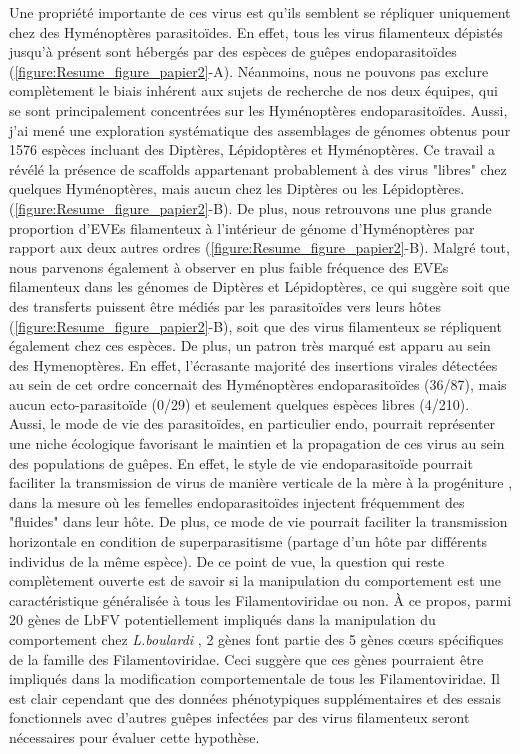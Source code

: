 Une propriété importante de ces virus est qu'ils semblent se répliquer uniquement chez des Hyménoptères parasitoïdes. En effet, tous les virus filamenteux dépistés jusqu'à présent sont hébergés par des espèces de guêpes endoparasitoïdes (\figurename{\ref{figure:Resume_figure_papier2}}-A). Néanmoins, nous ne pouvons pas exclure complètement le biais inhérent aux sujets de recherche de nos deux équipes, qui se sont principalement concentrées sur les Hyménoptères endoparasitoïdes. Aussi, j'ai mené une exploration systématique des assemblages de génomes obtenus pour 1576 espèces incluant des Diptères, Lépidoptères et Hyménoptères. Ce travail a révélé la présence de scaffolds appartenant probablement à des virus "libres" chez quelques Hyménoptères, mais aucun chez les Diptères ou les Lépidoptères. (\figurename{\ref{figure:Resume_figure_papier2}}-B). De plus, nous retrouvons une plus grande proportion d'EVEs filamenteux à l'intérieur de génome d'Hyménoptères par rapport aux deux autres ordres (\figurename{\ref{figure:Resume_figure_papier2}}-B). Malgré tout, nous parvenons également à observer en plus faible fréquence des EVEs filamenteux dans les génomes de  Diptères et Lépidoptères, ce qui suggère soit que des transferts puissent être médiés par les parasitoïdes vers leurs hôtes (\figurename{\ref{figure:Resume_figure_papier2}}-B), soit que des virus filamenteux se répliquent également chez ces espèces. De plus, un patron très marqué est apparu au sein des Hymenoptères. En effet, l'écrasante majorité des insertions virales détectées au sein de cet ordre concernait des Hyménoptères endoparasitoïdes (36/87), mais aucun ecto-parasitoïde (0/29) et seulement quelques espèces libres (4/210).\\

Aussi, le mode de vie des parasitoïdes, en particulier endo, pourrait représenter une niche écologique favorisant le maintien et la propagation de ces virus au sein des populations de guêpes. En effet, le style de vie endoparasitoïde pourrait faciliter la transmission de virus de manière verticale de la mère à la progéniture \citep{martinez_additional_2016}, dans la mesure où les femelles endoparasitoïdes injectent fréquemment des "fluides" dans leur hôte. De plus, ce mode de vie pourrait faciliter la transmission horizontale en condition de superparasitisme (partage d'un hôte par différents individus de la même espèce)\citep{varaldi_infectious_2003,coffman_viral_2022,stasiak_characteristics_2005}. De ce point de vue, la question qui reste complètement ouverte est de savoir si la manipulation du comportement est une caractéristique généralisée à tous les Filamentoviridae ou non. À ce propos, parmi 20 gènes de LbFV potentiellement impliqués dans la manipulation du comportement chez \textit{L.boulardi} \citep{varaldi_deciphering_2018}, 2 gènes font partie des 5 gènes cœurs spécifiques de la famille des Filamentoviridae. Ceci suggère que ces gènes pourraient être impliqués dans la modification comportementale de tous les Filamentoviridae. Il est clair cependant que des données phénotypiques supplémentaires et des essais fonctionnels avec d'autres guêpes infectées par des virus filamenteux seront nécessaires pour évaluer cette hypothèse.\\

